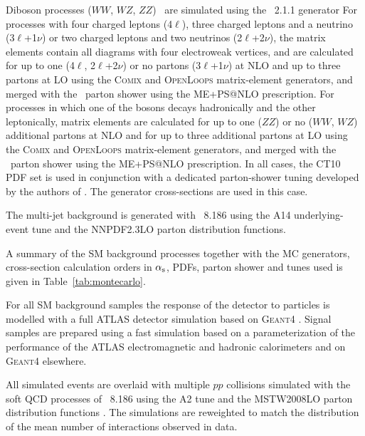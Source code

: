 Diboson processes ($WW$, $WZ$, $ZZ$)~\cite{ATL-PHYS-PUB-2016-002} are simulated using the  \sherpa~2.1.1 generator
For processes with four charged leptons (4$\ell$), three charged leptons and a neutrino (3$\ell$+1$\nu$) or two charged leptons and two neutrinos (2$\ell$+2$\nu$), the matrix elements contain all diagrams with four electroweak vertices, and are calculated for up to one (4$\ell$, 2$\ell$+2$\nu$) or no partons (3$\ell$+1$\nu$) at NLO and up to three partons at LO using the \textsc{Comix} and \textsc{OpenLoops} matrix-element generators, and merged with the \sherpa\ parton shower using the ME+PS@NLO prescription.
For processes in which one of the bosons decays hadronically and the other leptonically, matrix elements are calculated for up to one ($ZZ$) or no ($WW$, $WZ$) additional partons at NLO and for up to three additional partons at LO using the \textsc{Comix} and \textsc{OpenLoops} matrix-element generators, and merged with the \sherpa\ parton shower using the ME+PS@NLO prescription.
In all cases, the CT10 PDF set is used in conjunction with a dedicated parton-shower tuning developed by the authors of  \sherpa.
The generator cross-sections are used in this case.

The multi-jet background is generated with \pythia~8.186 using the A14 underlying-event tune and the NNPDF2.3LO parton distribution functions.

A summary of the SM background processes together with the MC generators, cross-section calculation orders in $\alpha_{\textrm s}$, PDFs, parton shower and tunes used is given in Table~\ref{tab:montecarlo}.



For all SM background samples the response of the detector to particles is modelled with a full ATLAS detector simulation \cite{:2010wqa} based on \textsc{Geant4} \cite{Agostinelli:2002hh}.
Signal samples are prepared using a fast simulation based on a parameterization of the performance of the ATLAS electromagnetic and hadronic calorimeters \cite{ATLAS:2010bfa} and on \textsc{Geant4} elsewhere.

All simulated events are overlaid with multiple $pp$ collisions simulated with the soft QCD processes of \pythia~8.186 using the A2 tune  \cite{A14tune} and the MSTW2008LO parton distribution functions \cite{Martin:2009iq}. The simulations are reweighted to match the distribution of the mean number of interactions observed in data. %

